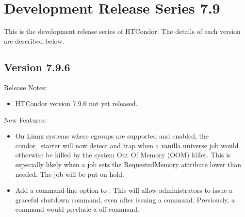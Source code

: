 
\section{\label{sec:History-7-9}Development Release Series 7.9}

This is the development release series of HTCondor.
The details of each version are described below.

\subsection*{\label{sec:New-7-9-6}Version 7.9.6}

\noindent Release Notes:

\begin{itemize}

\item HTCondor version 7.9.6 not yet released.

\end{itemize}


\noindent New Features:

\begin{itemize}

\item On Linux systems where cgroups are supported and enabled, the 
condor\_starter will now detect and trap when a vanilla universe job 
would otherwise be killed by the system Out Of Memory (OOM) killer.  
This is especially likely when a job sets the RequestedMemory attribute 
lower than needed.  The job will be put on hold.

\item Add a  command-line option to .  This
will allow administrators to issue a graceful shutdown command, even after
issuing a  command. Previously, a  
command would preclude a  off command.

\end{itemize}

